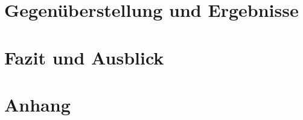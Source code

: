 \documentclass[parskip, twoside, accentcolor=tud9b, colorback, breaklinks, noresetcounter, noheadingspace, pdfencoding=unicode, 11pt, bigchapter, numbersubsubsec, numbers=noenddot, linedtoc, longdoc]{tudreport}
\begin{document}
\chapter{Gegen\"uberstellung und Ergebnisse}\label{chap:ergebnis}
	
	
	
	
\chapter{Fazit und Ausblick}\label{chap:fazit}
	

	
\pagestyle{plain}
\appendix
\newcommand{\hiddensection}[1]{
    \stepcounter{section}
    \section*{\Alph{chapter}.\arabic{section}\hspace{0.8em}{#1}}
}
\chapter{Anhang}
    
    



\newpage
% 
    
%     
%     
%     
% 
% 	
% 	
% 	
% 	
	
	
	
\cleardoublepage



\cleardoublepage
\end{document}
